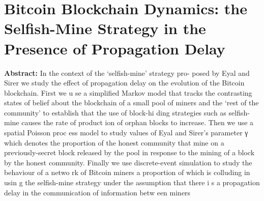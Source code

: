 \section{Bitcoin Blockchain Dynamics: the Selfish-Mine Strategy in the Presence of Propagation Delay }

\textbf{Abstract:} 
In the context of the ‘selfish-mine’ strategy pro- posed by Eyal and Sirer we study the effect of propagation delay on the evolution of the Bitcoin blockchain. First we u se a simplified Markov model that tracks the contrasting states of belief about the blockchain of a small pool of miners and the ‘rest of the community’ to establish that the use of block-hi ding strategies such as selfish-mine causes the rate of product ion of orphan blocks to increase. Then we use a spatial Poisson proc ess model to study values of Eyal and Sirer’s parameter γ which denotes the proportion of the honest community that mine on a previously-secret block released by the pool in response to the mining of a block by the honest community. Finally we use discrete-event simulation to study the behaviour of a netwo rk of Bitcoin miners a proportion of which is colluding in usin g the selfish-mine strategy under the assumption that there i s a propagation delay in the communication of information betw een miners
